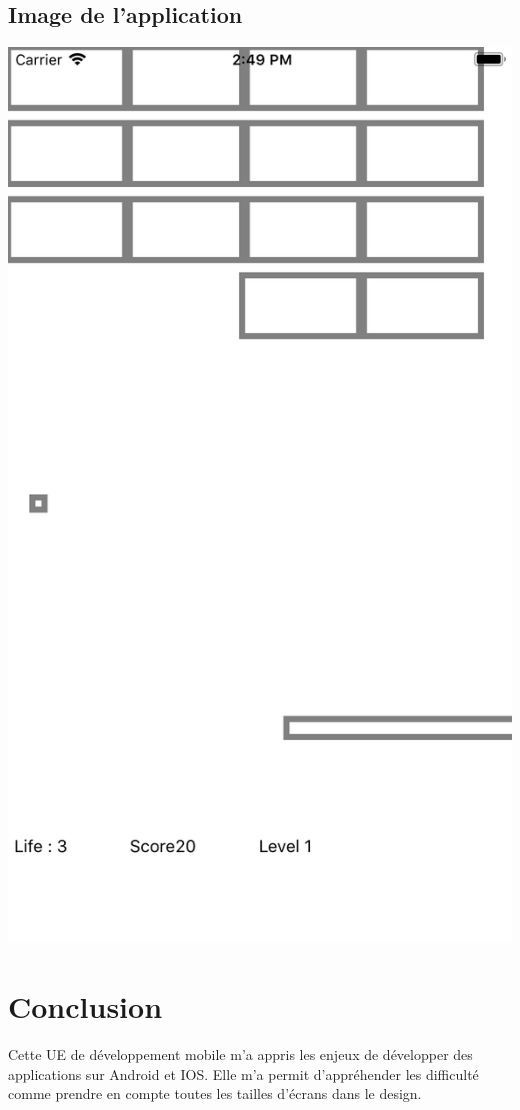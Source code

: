 \documentclass[a4paper]{article}
\begin{document}
\subsection{Image de l'application}
\begin{center}
 \includegraphics[scale=0.25]{IOS.png}
\end{center}
\section{Conclusion}
Cette UE de développement mobile m'a appris les enjeux de développer des applications sur Android et IOS. Elle m'a permit d’appréhender les difficulté comme prendre en compte toutes les tailles d'écrans dans le design.
\end{document}
